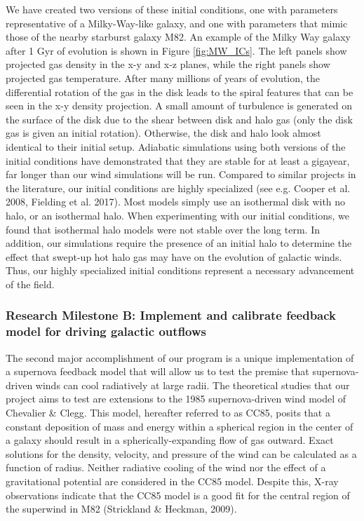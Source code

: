 \documentclass[11pt,letterpaper,english]{article}
\begin{document}
We have created two versions of these initial conditions, one with parameters representative of a Milky-Way-like galaxy, and one with parameters that mimic those of the nearby starburst galaxy M82. An example of the Milky Way galaxy after 1 Gyr of evolution is shown in Figure \ref{fig:MW_ICs}. The left panels show projected gas density in the x-y and x-z planes, while the right panels show projected gas temperature. After many millions of years of evolution, the differential rotation of the gas in the disk leads to the spiral features that can be seen in the x-y density projection. A small amount of turbulence is generated on the surface of the disk due to the shear between disk and halo gas (only the disk gas is given an initial rotation). Otherwise, the disk and halo look almost identical to their initial setup.
Adiabatic simulations using both versions of the initial conditions have demonstrated that they are stable for at least a gigayear, far longer than our wind simulations will be run. Compared to similar projects in the literature, our initial conditions are highly specialized (see e.g. Cooper et al. 2008, Fielding et al. 2017). Most models simply use an isothermal disk with no halo, or an isothermal halo. When experimenting with our initial conditions, we found that isothermal halo models were not stable over the long term. In addition, our simulations require the presence of an initial halo to determine the effect that swept-up hot halo gas may have on the evolution of galactic winds. Thus, our highly specialized initial conditions represent a necessary advancement of the field.

\subsubsection{Research Milestone B: Implement and calibrate feedback model for driving galactic outflows}

The second major accomplishment of our program is a unique implementation of a supernova feedback model that will allow us to test the premise that supernova-driven winds can cool radiatively at large radii. The theoretical studies that our project aims to test are extensions to the 1985 supernova-driven wind model of Chevalier \& Clegg. This model, hereafter referred to as CC85, posits that a constant deposition of mass and energy within a spherical region in the center of a galaxy should result in a spherically-expanding flow of gas outward. Exact solutions for the density, velocity, and pressure of the wind can be calculated as a function of radius. Neither radiative cooling of the wind nor the effect of a gravitational potential are considered in the CC85 model. Despite this, X-ray observations indicate that the CC85 model is a good fit for the central region of the superwind in M82 (Strickland \& Heckman, 2009).
\end{document}
